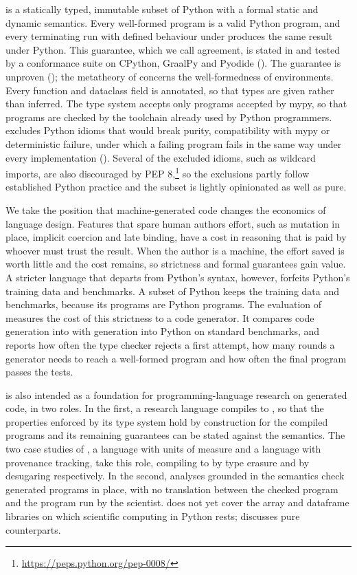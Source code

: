 \PurePy is a statically typed, immutable subset of Python with a formal static and dynamic semantics. Every
well-formed \PurePy program is a valid Python program, and every terminating run with defined behaviour under \PurePy
produces the same result under Python. This guarantee, which we call agreement, is stated in
 and tested by a conformance suite on CPython, GraalPy and Pyodide
(). The guarantee is unproven (); the metatheory of
 concerns the well-formedness of environments. Every function and dataclass field is
annotated, so that types are given rather than inferred. The type system accepts only programs accepted by
mypy, so that \PurePy programs are checked by the toolchain already used by Python programmers. \PurePy
excludes Python idioms that would break purity, compatibility with mypy or deterministic failure, under which
a failing program fails in the same way under every implementation (). Several of the excluded
idioms, such as wildcard imports, are also discouraged by PEP 8,\footnote{\url{https://peps.python.org/pep-0008/}}
so the exclusions partly follow established Python practice and the subset is lightly opinionated as well as
pure.

We take the position that machine-generated code changes the economics of language design. Features that
spare human authors effort, such as mutation in place, implicit coercion and late binding, have a cost in
reasoning that is paid by whoever must trust the result. When the author is a machine, the effort saved is worth
little and the cost remains, so strictness and formal guarantees gain value. A stricter language that departs
from Python's syntax, however, forfeits Python's training data and benchmarks. A subset of Python keeps the
training data and benchmarks, because its programs are Python programs. The evaluation of 
measures the cost of this strictness to a code generator. It compares code generation into \PurePy with
generation into Python on standard benchmarks, and reports how often the type checker rejects a
first attempt, how many rounds a generator needs to reach a well-formed program and how often the final program
passes the tests.

\PurePy is also intended as a foundation for programming-language research on generated code, in two roles.
In the first, a research language compiles to \PurePy, so that the properties enforced by its type system
hold by construction for the compiled programs and its remaining guarantees can be stated against the \PurePy
semantics. The two case studies of , a language with units of measure and a language
with provenance tracking, take this role, compiling to \PurePy by type erasure and by desugaring respectively.
In the second, analyses grounded in the \PurePy semantics check generated programs in place, with no
translation between the checked program and the program run by the scientist. \PurePy does not yet cover the
array and dataframe libraries on which scientific computing in Python rests;  discusses
pure counterparts.

